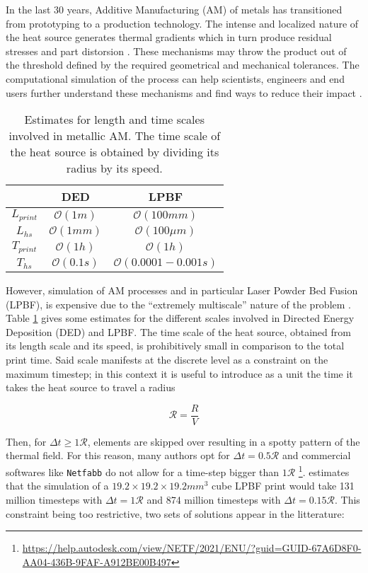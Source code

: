 In the last 30 years, Additive Manufacturing (AM) of metals has transitioned from
prototyping to a production technology. The intense and localized nature of the
heat source generates thermal gradients which in turn produce residual stresses
and part distorsion \cite{Fu2014}.
These mechanisms may throw the product out of the threshold defined by
the required geometrical and mechanical tolerances.
The computational simulation of the process can help
scientists, engineers and end users further understand these mechanisms
and find ways to reduce their impact \cite{Lu2022}.\par

\begin{table}[h]
  \centering
  \begin{tabular}{|c|c|c|}
    \hline
    & DED & LPBF \\
    \hline
    $L_{print}$ & $\mathcal{O}(1 m   )$ &  $\mathcal{O}(100 mm    )$  \\
    $L_{hs}$    & $\mathcal{O}(1 mm  )$ &  $\mathcal{O}(100 \mu m)$  \\
    $T_{print}$ & $\mathcal{O}(1 h   )$ &  $\mathcal{O}(1 h       )$  \\
    $T_{hs}$    & $\mathcal{O}(0.1 s )$ &  $\mathcal{O}(0.0001-0.001 s  )$  \\
    \hline
  \end{tabular}
  \caption{Estimates for length and time scales involved in metallic AM. The time
  scale of the heat source is obtained by dividing its radius by its
  speed.}
  \label{tbl:scales}
\end{table}

However, simulation of AM processes and in particular Laser Powder Bed Fusion (LPBF), is
expensive due to the ``extremely multiscale'' nature
of the problem \cite{Hodge2021}.
Table \ref{tbl:scales}
gives some estimates for the different scales involved in Directed Energy Deposition (DED) and LPBF.
The time scale of the heat source, obtained from its length scale and its speed,
is prohibitively small in comparison to the total print time.
Said scale manifests at the discrete level
as a constraint on the maximum timestep; in this context
it is useful to introduce as a unit
the time it takes the heat source to travel a radius

\begin{equation}\label{eq:trad}
\mathcal{R} = \frac{R}{V}
\end{equation}

Then, for $\Delta t \geq 1 \mathcal{R}$, elements are skipped over resulting
in a spotty pattern of the thermal field.
For this reason, many authors opt for
$\Delta t = 0.5\mathcal{R}$ \cite{Patil2021, Michaleris2014, Stender2018}
and commercial softwares like \texttt{Netfabb}
do not allow for a time-step bigger than $1 \mathcal{R}$
\footnote{\url{https://help.autodesk.com/view/NETF/2021/ENU/?guid=GUID-67A6D8F0-AA04-436B-9FAF-A912BE00B497}}.
\cite{Hodge2021} estimates that the simulation of a
$19.2 \times 19.2 \times 19.2 mm^3$ cube LPBF print would take 
131 million timesteps with $\Delta t = 1 \mathcal{R}$ and
874 million timesteps with $\Delta t = 0.15 \mathcal{R}$.
This constraint being too restrictive, two sets of solutions
appear in the litterature:

